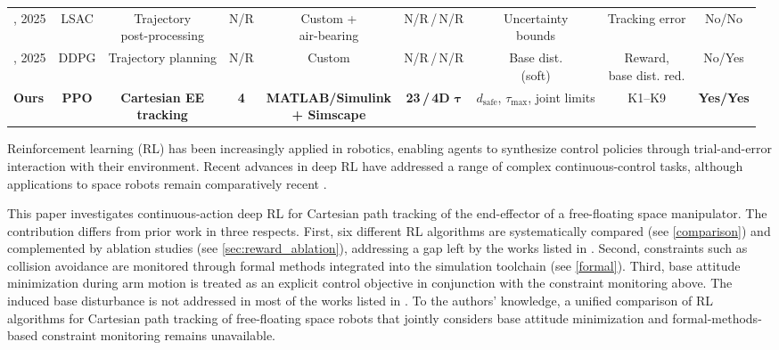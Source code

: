 \documentclass{ieeeaccess}
\begin{document}
\begin{table}[!t]
\begin{tabular}{lcccccccc}
		\cite{zhang2025learning}, 2025 & LSAC & \makecell{Trajectory\\post-processing} & N/R & \makecell{Custom +\\air-bearing} & N/R\,/\,N/R & \makecell{Uncertainty\\bounds} & Tracking error & No/No \\
		\cite{wei2025trajectory}, 2025 & DDPG & Trajectory planning & N/R & Custom & N/R\,/\,N/R & \makecell{Base dist.\\(soft)} & \makecell{Reward,\\base dist. red.} & No/Yes \\
		\midrule
		\textbf{Ours} & \textbf{PPO} & \makecell{\textbf{Cartesian EE}\\\textbf{tracking}} & \textbf{4} & \makecell{\textbf{MATLAB/Simulink}\\\textbf{+ Simscape}} & \textbf{23\,/\,4D} $\boldsymbol{\tau}$ & \makecell{$d_\text{safe}$, $\tau_\text{max}$,\\joint limits} & K1--K9 & \textbf{Yes/Yes} \\
		\bottomrule
	\end{tabular}
\end{table}

Reinforcement learning (RL) has been increasingly applied in robotics, enabling agents to
synthesize control policies through trial-and-error interaction with their environment. Recent advances in deep RL
have addressed a range of complex continuous-control tasks, although applications to space robots remain
comparatively recent \cite{wu2020reinforcement,al2024path,hu2025deep,zhang2025learning,huang2023obstacle}.

This paper investigates continuous-action deep RL for Cartesian path tracking of the end-effector of
a free-floating space
manipulator. The contribution differs from prior work in three respects. First, six different RL
algorithms are systematically compared (see \cref{comparison}) and complemented by ablation studies (see \cref{sec:reward_ablation}), addressing
a gap left by the works listed in . Second, constraints such as collision
avoidance are monitored
through formal methods integrated into the simulation toolchain (see \cref{formal}). Third, base attitude minimization
during arm motion is treated as an explicit control objective in conjunction with the
constraint monitoring above. The induced base disturbance is not addressed in most of the
works listed in . To the authors' knowledge, a unified comparison of RL algorithms
for Cartesian path tracking of free-floating space robots that jointly considers base attitude minimization
and formal-methods-based constraint monitoring remains unavailable.
\end{document}
